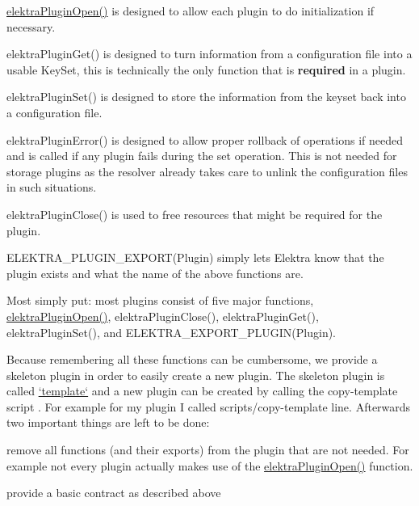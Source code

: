 \begin{DoxyItemize}
\item {\ttfamily \hyperlink{elektra_2plugin_8c_a32a70a7876542c51d153164ac5108a57}{elektra\+Plugin\+Open()}} is designed to allow each plugin to do initialization if necessary.
\item {\ttfamily elektra\+Plugin\+Get()} is designed to turn information from a configuration file into a usable {\ttfamily Key\+Set}, this is technically the only function that is {\bfseries required} in a plugin.
\item {\ttfamily elektra\+Plugin\+Set()} is designed to store the information from the keyset back into a configuration file.
\item {\ttfamily elektra\+Plugin\+Error()} is designed to allow proper rollback of operations if needed and is called if any plugin fails during the set operation. This is not needed for storage plugins as the resolver already takes care to unlink the configuration files in such situations.
\item {\ttfamily elektra\+Plugin\+Close()} is used to free resources that might be required for the plugin.
\item {\ttfamily E\+L\+E\+K\+T\+R\+A\+\_\+\+P\+L\+U\+G\+I\+N\+\_\+\+E\+X\+P\+O\+R\+T(\+Plugin)} simply lets Elektra know that the plugin exists and what the name of the above functions are.
\end{DoxyItemize}

Most simply put\+: most plugins consist of five major functions, {\ttfamily \hyperlink{elektra_2plugin_8c_a32a70a7876542c51d153164ac5108a57}{elektra\+Plugin\+Open()}}, {\ttfamily elektra\+Plugin\+Close()}, {\ttfamily elektra\+Plugin\+Get()}, {\ttfamily elektra\+Plugin\+Set()}, and {\ttfamily E\+L\+E\+K\+T\+R\+A\+\_\+\+E\+X\+P\+O\+R\+T\+\_\+\+P\+L\+U\+G\+I\+N(\+Plugin)}.

Because remembering all these functions can be cumbersome, we provide a skeleton plugin in order to easily create a new plugin. The skeleton plugin is called \hyperlink{md_src_plugins_template_README_src_plugins_template_README_md}{`template`} and a new plugin can be created by calling the copy-\/template script . For example for my plugin I called {\ttfamily scripts/copy-\/template line}. Afterwards two important things are left to be done\+:


\begin{DoxyItemize}
\item remove all functions (and their exports) from the plugin that are not needed. For example not every plugin actually makes use of the {\ttfamily \hyperlink{elektra_2plugin_8c_a32a70a7876542c51d153164ac5108a57}{elektra\+Plugin\+Open()}} function.
\item provide a basic contract as described above
\end{DoxyItemize}

